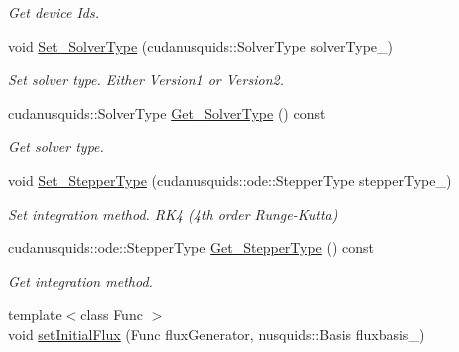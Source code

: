\begin{DoxyCompactItemize}
\begin{DoxyCompactList}\small\item\em Get device Ids. \end{DoxyCompactList}\item 
void \hyperlink{structcudanusquids_1_1ParameterObject_a664a3baba5274873a96f23087dbaecb4}{Set\+\_\+\+Solver\+Type} (cudanusquids\+::\+Solver\+Type solver\+Type\+\_\+)\hypertarget{structcudanusquids_1_1ParameterObject_a664a3baba5274873a96f23087dbaecb4}{}\label{structcudanusquids_1_1ParameterObject_a664a3baba5274873a96f23087dbaecb4}

\begin{DoxyCompactList}\small\item\em Set solver type. Either Version1 or Version2. \end{DoxyCompactList}\item 
cudanusquids\+::\+Solver\+Type \hyperlink{structcudanusquids_1_1ParameterObject_afdac176277cb71683ba5bc9d2fd2ed51}{Get\+\_\+\+Solver\+Type} () const \hypertarget{structcudanusquids_1_1ParameterObject_afdac176277cb71683ba5bc9d2fd2ed51}{}\label{structcudanusquids_1_1ParameterObject_afdac176277cb71683ba5bc9d2fd2ed51}

\begin{DoxyCompactList}\small\item\em Get solver type. \end{DoxyCompactList}\item 
void \hyperlink{structcudanusquids_1_1ParameterObject_a6c87fe0035ad65250cbea4a818c40819}{Set\+\_\+\+Stepper\+Type} (cudanusquids\+::ode\+::\+Stepper\+Type stepper\+Type\+\_\+)\hypertarget{structcudanusquids_1_1ParameterObject_a6c87fe0035ad65250cbea4a818c40819}{}\label{structcudanusquids_1_1ParameterObject_a6c87fe0035ad65250cbea4a818c40819}

\begin{DoxyCompactList}\small\item\em Set integration method. R\+K4 (4th order Runge-\/\+Kutta) \end{DoxyCompactList}\item 
cudanusquids\+::ode\+::\+Stepper\+Type \hyperlink{structcudanusquids_1_1ParameterObject_aa6db5e6015edad7e24eee4ab51cb7f7d}{Get\+\_\+\+Stepper\+Type} () const \hypertarget{structcudanusquids_1_1ParameterObject_aa6db5e6015edad7e24eee4ab51cb7f7d}{}\label{structcudanusquids_1_1ParameterObject_aa6db5e6015edad7e24eee4ab51cb7f7d}

\begin{DoxyCompactList}\small\item\em Get integration method. \end{DoxyCompactList}\item 
{\footnotesize template$<$class Func $>$ }\\void \hyperlink{structcudanusquids_1_1ParameterObject_a420592083eba134c1517f69fce11e170}{set\+Initial\+Flux} (Func flux\+Generator, nusquids\+::\+Basis fluxbasis\+\_\+)\hypertarget{structcudanusquids_1_1ParameterObject_a420592083eba134c1517f69fce11e170}{}\label{structcudanusquids_1_1ParameterObject_a420592083eba134c1517f69fce11e170}


\end{DoxyCompactItemize}
